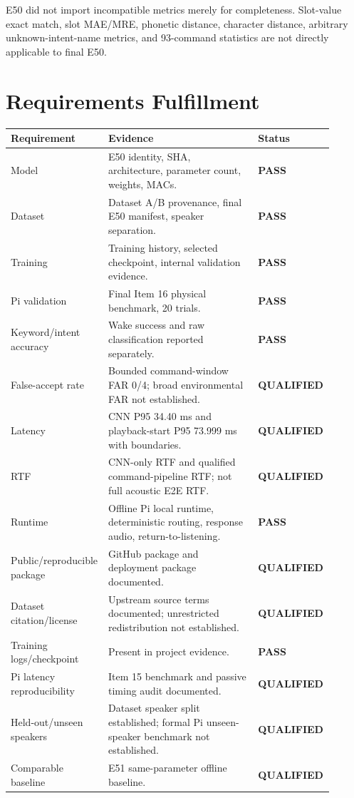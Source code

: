 \documentclass[11pt]{article}
\newcommand{\statuspass}{\textbf{PASS}}
\newcommand{\statusqualified}{\textbf{QUALIFIED}}
\begin{document}
E50 did not import incompatible metrics merely for completeness. Slot-value exact match, slot MAE/MRE, phonetic distance, character distance, arbitrary unknown-intent-name metrics, and 93-command statistics are not directly applicable to final E50.
\newpage
\section{Requirements Fulfillment}

\begin{longtable}{p{0.26\linewidth}p{0.46\linewidth}p{0.18\linewidth}}
\toprule
\textbf{Requirement} & \textbf{Evidence} & \textbf{Status} \\
\midrule
Model & E50 identity, SHA, architecture, parameter count, weights, MACs. & \statuspass \\
Dataset & Dataset A/B provenance, final E50 manifest, speaker separation. & \statuspass \\
Training & Training history, selected checkpoint, internal validation evidence. & \statuspass \\
Pi validation & Final Item 16 physical benchmark, 20 trials. & \statuspass \\
Keyword/intent accuracy & Wake success and raw classification reported separately. & \statuspass \\
False-accept rate & Bounded command-window FAR 0/4; broad environmental FAR not established. & \statusqualified \\
Latency & CNN P95 34.40 ms and playback-start P95 73.999 ms with boundaries. & \statusqualified \\
RTF & CNN-only RTF and qualified command-pipeline RTF; not full acoustic E2E RTF. & \statusqualified \\
Runtime & Offline Pi local runtime, deterministic routing, response audio, return-to-listening. & \statuspass \\
Public/reproducible package & GitHub package and deployment package documented. & \statusqualified \\
Dataset citation/license & Upstream source terms documented; unrestricted redistribution not established. & \statusqualified \\
Training logs/checkpoint & Present in project evidence. & \statuspass \\
Pi latency reproducibility & Item 15 benchmark and passive timing audit documented. & \statusqualified \\
Held-out/unseen speakers & Dataset speaker split established; formal Pi unseen-speaker benchmark not established. & \statusqualified \\
Comparable baseline & E51 same-parameter offline baseline. & \statusqualified \\
\bottomrule
\end{longtable}
\newpage
\end{document}
